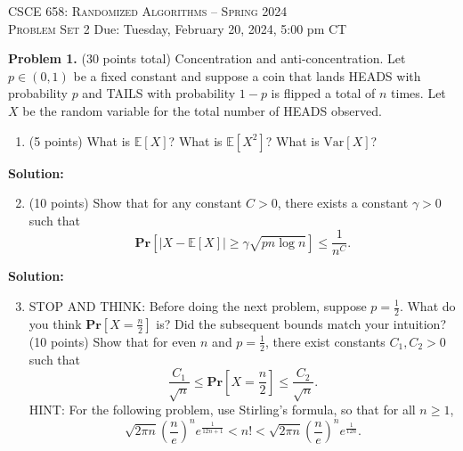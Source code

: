 \documentclass[11pt]{article}
\newcommand{\Ex}[1]{\ensuremath{\mathbb{E}\left[#1\right]}}
\newcommand{\Var}[1]{\ensuremath{\text{Var}\left[#1\right]}}
\newcommand{\PPr}[1]{\ensuremath{\mathbf{Pr}\left[#1\right]}}
\begin{document}
\begin{center}
{\Large\textsc{CSCE 658: Randomized Algorithms -- Spring 2024 \\ 
Problem Set 2}}
\vskip 0.1in
Due: Tuesday, February 20, 2024, 5:00 pm CT
\end{center}


\noindent
\textbf{Problem 1.} (30 points total)
Concentration and anti-concentration.
\vskip 0.1in\noindent
Let $p\in(0,1)$ be a fixed constant and suppose a coin that lands HEADS with probability $p$ and TAILS with probability $1-p$ is flipped a total of $n$ times. Let $X$ be the random variable for the total number of HEADS observed. 
\begin{enumerate}
\item (5 points)
What is $\Ex{X}$? What is $\Ex{X^2}$? What is $\Var{X}$?
\end{enumerate}

\noindent\textbf{Solution:}








\begin{enumerate}
\setcounter{enumi}{1}
\item (10 points)
Show that for any constant $C>0$, there exists a constant $\gamma>0$ such that 
\[\PPr{|X-\Ex{X}|\ge\gamma\sqrt{pn\log n}}\le\frac{1}{n^C}.\]
\end{enumerate}

\noindent\textbf{Solution:}






\begin{enumerate}
\setcounter{enumi}{2}
\item
STOP AND THINK: Before doing the next problem, suppose $p=\frac{1}{2}$. What do you think $\PPr{X=\frac{n}{2}}$ is? Did the subsequent bounds match your intuition?
\vskip 0.1in\noindent (10 points)
Show that for even $n$ and $p=\frac{1}{2}$, there exist constants $C_1,C_2>0$ such that
\[\frac{C_1}{\sqrt{n}}\le\PPr{X=\frac{n}{2}}\le\frac{C_2}{\sqrt{n}}.\]
\vskip 0.1in\noindent
HINT: For the following problem, use Stirling's formula, so that for all $n\ge 1$,
\[\sqrt{2\pi n}\left(\frac{n}{e}\right)^n e^{\frac{1}{12n+1}}<n!<\sqrt{2\pi n}\left(\frac{n}{e}\right)^n e^{\frac{1}{12n}}.\]
\end{enumerate}
\end{document}

